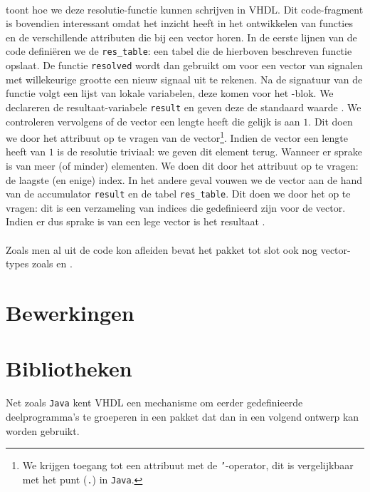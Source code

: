 \paragraph{}
 toont hoe we deze resolutie-functie kunnen schrijven in VHDL. Dit code-fragment is bovendien interessant omdat het inzicht heeft in het ontwikkelen van functies en de verschillende attributen die bij een vector horen. In de eerste lijnen van de code defini\"eren we de \texttt{res\_table}: een tabel die de hierboven beschreven functie opslaat. De functie \texttt{resolved} wordt dan gebruikt om voor een vector van signalen met willekeurige grootte een nieuw signaal uit te rekenen. Na de signatuur van de functie volgt een lijst van lokale variabelen, deze komen voor het -blok. We declareren de resultaat-variabele \texttt{result} en geven deze de standaard waarde . We controleren vervolgens of de vector een lengte heeft die gelijk is aan $1$. Dit doen we door het  attribuut op te vragen van de vector\footnote{We krijgen toegang tot een attribuut met de \texttt{'}-operator, dit is vergelijkbaar met het punt (\texttt{.}) in \texttt{Java}.}. Indien de vector een lengte heeft van $1$ is de resolutie triviaal: we geven dit element terug. Wanneer er sprake is van meer (of minder) elementen. We doen dit door het  attribuut op te vragen: de laagste (en enige) index. In het andere geval vouwen we de vector aan de hand van de accumulator \texttt{result} en de tabel \texttt{res\_table}. Dit doen we door het  op te vragen: dit is een verzameling van indices die gedefinieerd zijn voor de vector. Indien er dus sprake is van een lege vector is het resultaat .

\paragraph{}
Zoals men al uit de code kon afleiden bevat het pakket tot slot ook nog vector-types zoals  en .

\section{Bewerkingen}

\section{Bibliotheken}
Net zoals \texttt{Java} kent VHDL een mechanisme om eerder gedefinieerde deelprogramma's te groeperen in een pakket dat dan in een volgend ontwerp kan worden gebruikt.

